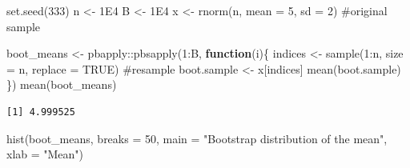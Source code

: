 \documentclass[
  letterpaper,
  DIV=11,
  numbers=noendperiod]{scrreprt}
\newenvironment{Shaded}{\begin{snugshade}}{\end{snugshade}}
\newcommand{\AttributeTok}[1]{\textcolor[rgb]{0.40,0.45,0.13}{#1}}
\newcommand{\CommentTok}[1]{\textcolor[rgb]{0.37,0.37,0.37}{#1}}
\newcommand{\ConstantTok}[1]{\textcolor[rgb]{0.56,0.35,0.01}{#1}}
\newcommand{\ControlFlowTok}[1]{\textcolor[rgb]{0.00,0.23,0.31}{\textbf{#1}}}
\newcommand{\DecValTok}[1]{\textcolor[rgb]{0.68,0.00,0.00}{#1}}
\newcommand{\FloatTok}[1]{\textcolor[rgb]{0.68,0.00,0.00}{#1}}
\newcommand{\FunctionTok}[1]{\textcolor[rgb]{0.28,0.35,0.67}{#1}}
\newcommand{\NormalTok}[1]{\textcolor[rgb]{0.00,0.23,0.31}{#1}}
\newcommand{\OtherTok}[1]{\textcolor[rgb]{0.00,0.23,0.31}{#1}}
\newcommand{\SpecialCharTok}[1]{\textcolor[rgb]{0.37,0.37,0.37}{#1}}
\newcommand{\StringTok}[1]{\textcolor[rgb]{0.13,0.47,0.30}{#1}}
\begin{document}
\begin{tcolorbox}[enhanced jigsaw, bottomtitle=1mm, colbacktitle=quarto-callout-note-color!10!white, breakable, arc=.35mm, leftrule=.75mm, left=2mm, toptitle=1mm, colframe=quarto-callout-note-color-frame, opacityback=0, colback=white, coltitle=black, rightrule=.15mm, titlerule=0mm, title=\textcolor{quarto-callout-note-color}{\faInfo}\hspace{0.5em}{Simple example of Bootstrap}, toprule=.15mm, opacitybacktitle=0.6, bottomrule=.15mm]

\begin{Shaded}
\begin{Highlighting}[]
\FunctionTok{set.seed}\NormalTok{(}\DecValTok{333}\NormalTok{)}
\NormalTok{n }\OtherTok{\textless{}{-}} \FloatTok{1E4}
\NormalTok{B }\OtherTok{\textless{}{-}} \FloatTok{1E4}
\NormalTok{x }\OtherTok{\textless{}{-}} \FunctionTok{rnorm}\NormalTok{(n, }\AttributeTok{mean =} \DecValTok{5}\NormalTok{, }\AttributeTok{sd =} \DecValTok{2}\NormalTok{) }\CommentTok{\#original sample}


\NormalTok{boot\_means }\OtherTok{\textless{}{-}}\NormalTok{ pbapply}\SpecialCharTok{::}\FunctionTok{pbsapply}\NormalTok{(}\DecValTok{1}\SpecialCharTok{:}\NormalTok{B, }\ControlFlowTok{function}\NormalTok{(i)\{}
\NormalTok{  indices }\OtherTok{\textless{}{-}} \FunctionTok{sample}\NormalTok{(}\DecValTok{1}\SpecialCharTok{:}\NormalTok{n, }\AttributeTok{size =}\NormalTok{ n, }\AttributeTok{replace =} \ConstantTok{TRUE}\NormalTok{) }\CommentTok{\#resample}
\NormalTok{  boot.sample }\OtherTok{\textless{}{-}}\NormalTok{ x[indices]}
  \FunctionTok{mean}\NormalTok{(boot.sample)}
\NormalTok{\}) }
\FunctionTok{mean}\NormalTok{(boot\_means)}
\end{Highlighting}
\end{Shaded}

\begin{verbatim}
[1] 4.999525
\end{verbatim}

\begin{Shaded}
\begin{Highlighting}[]
\FunctionTok{hist}\NormalTok{(boot\_means, }\AttributeTok{breaks =} \DecValTok{50}\NormalTok{, }\AttributeTok{main =} \StringTok{"Bootstrap distribution of the mean"}\NormalTok{, }\AttributeTok{xlab =} \StringTok{"Mean"}\NormalTok{)}
\end{Highlighting}
\end{Shaded}


\end{tcolorbox}
\end{document}
